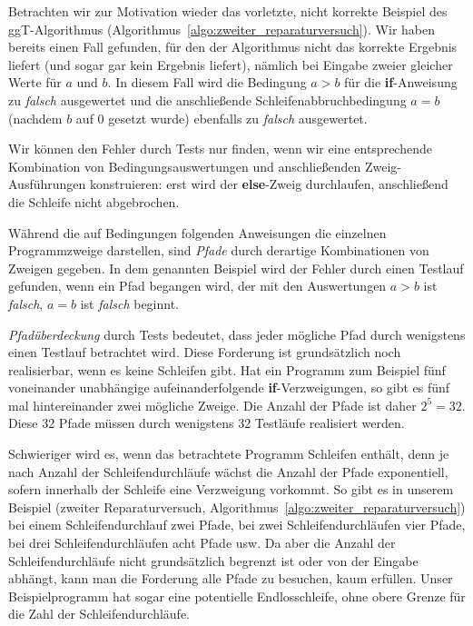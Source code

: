 \vspace{1mm} %


Betrachten wir zur Motivation wieder das vorletzte, nicht korrekte Beispiel des ggT-Algo\-rith\-mus (Algorithmus~\ref{algo:zweiter_reparaturversuch}). Wir haben bereits einen Fall gefunden, für den der Algorithmus nicht das korrekte Ergebnis liefert (und sogar gar kein Ergebnis liefert), nämlich bei Eingabe zweier gleicher Werte für $a$ und $b$. In diesem Fall wird die Bedingung $a>b$ für die \textbf{if}-Anweisung zu \emph{falsch} ausgewertet und die anschließende Schleifenabbruchbedingung $a=b$ (nachdem $b$ auf 0 gesetzt wurde) ebenfalls zu \emph{falsch} ausgewertet.

Wir können den Fehler durch Tests nur finden, wenn wir eine entsprechende Kombination von Bedingungsauswertungen und anschließenden Zweig-Ausführungen konstruieren: erst wird der \textbf{else}-Zweig durchlaufen, anschließend die Schleife nicht abgebrochen.

Während die auf Bedingungen folgenden Anweisungen die einzelnen Programmzweige darstellen, sind \emph{Pfade} durch derartige Kombinationen von Zweigen gegeben. In dem genannten Beispiel wird der Fehler durch einen Testlauf gefunden, wenn ein Pfad begangen wird, der mit den Auswertungen $a>b$ ist \emph{falsch}, $a=b$ ist \emph{falsch} beginnt.

\emph{Pfadüberdeckung} 
durch Tests bedeutet, dass jeder mögliche Pfad durch wenigstens einen Testlauf betrachtet wird. Diese Forderung ist grundsätzlich noch realisierbar, wenn es keine Schleifen gibt. Hat ein Programm zum Beispiel fünf voneinander unabhängige aufeinanderfolgende \textbf{if}-Verzweigungen, so gibt es fünf mal hintereinander zwei mögliche Zweige. Die Anzahl der Pfade ist daher $2^5 = 32$. Diese 32 Pfade müssen durch wenigstens 32 Testläufe realisiert werden.

Schwieriger wird es, wenn das betrachtete Programm Schleifen enthält, denn je nach Anzahl der Schleifendurchläufe wächst die Anzahl der Pfade exponentiell, sofern innerhalb der Schleife eine Verzweigung vorkommt. So gibt es in unserem Beispiel (zweiter Reparaturversuch, Algorithmus~\ref{algo:zweiter_reparaturversuch}) bei einem Schleifendurchlauf zwei \mbox{Pfade}, bei zwei Schleifendurchläufen vier Pfade, bei drei Schleifendurchläufen acht Pfade usw. Da aber die Anzahl der Schleifendurchläufe nicht grundsätzlich begrenzt ist oder von der Eingabe abhängt, kann man die Forderung alle Pfade zu besuchen, kaum erfüllen. Unser Beispielprogramm hat sogar eine potentielle Endlosschleife, ohne obere Grenze für die Zahl der Schleifendurchläufe.

